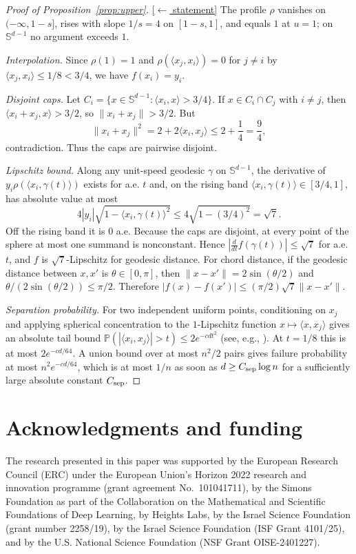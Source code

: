 \documentclass[11pt,reqno]{amsart}
\theoremstyle{plain}
\theoremstyle{definition}
\theoremstyle{remark}
\newcommand{\Sd}{\mathbb{S}^{d-1}}
\newcommand{\PP}{\mathbb{P}}
\newcommand{\inn}[2]{\langle #1,#2\rangle}
\newcommand{\stmtbutton}[1]{\hyperref[#1]{\textnormal{\footnotesize\textsf{[$\leftarrow$ statement]}}}}
\begin{document}
\begin{proof}[Proof of Proposition~\textup{\ref{prop:upper}}]\label{proof:upper}\stmtbutton{prop:upper}
The profile $\rho$ vanishes on $(-\infty,1-s]$, rises with slope $1/s=4$ on $[1-s,1]$, and equals $1$ at $u=1$; on $\Sd$ no argument exceeds $1$.

\emph{Interpolation.} Since $\rho(1)=1$ and $\rho(\inn{x_j}{x_i})=0$ for $j\ne i$ by $\inn{x_j}{x_i}\le1/8<3/4$, we have $f(x_i)=y_i$.

\emph{Disjoint caps.} Let $C_i=\{x\in\Sd:\inn{x_i}{x}>3/4\}$. If $x\in C_i\cap C_j$ with $i\ne j$, then $\inn{x_i+x_j}{x}>3/2$, so $\|x_i+x_j\|>3/2$. But
\[
        \|x_i+x_j\|^2=2+2\inn{x_i}{x_j}\le 2+\frac14=\frac94,
\]
contradiction. Thus the caps are pairwise disjoint.

\emph{Lipschitz bound.} Along any unit-speed geodesic $\gamma$ on $\Sd$, the derivative of $y_i\rho(\inn{x_i}{\gamma(t)})$ exists for a.e. $t$ and, on the rising band $\inn{x_i}{\gamma(t)}\in[3/4,1]$, has absolute value at most
\[
        4|y_i|\sqrt{1-\inn{x_i}{\gamma(t)}^2}\le4\sqrt{1-(3/4)^2}=\sqrt7.
\]
Off the rising band it is $0$ a.e. Because the caps are disjoint, at every point of the sphere at most one summand is nonconstant. Hence $|\frac{d}{dt}f(\gamma(t))|\le\sqrt7$ for a.e. $t$, and $f$ is $\sqrt7$-Lipschitz for geodesic distance. For chord distance, if the geodesic distance between $x,x'$ is $\theta\in[0,\pi]$, then $\|x-x'\|=2\sin(\theta/2)$ and $\theta/(2\sin(\theta/2))\le\pi/2$. Therefore $|f(x)-f(x')|\le(\pi/2)\sqrt7\|x-x'\|$.

\emph{Separation probability.} For two independent uniform points, conditioning on $x_j$ and applying spherical concentration to the $1$-Lipschitz function $x\mapsto\inn{x}{x_j}$ gives an absolute tail bound $\PP(|\inn{x_i}{x_j}|>t)\le2e^{-c d t^2}$ (see, e.g., \cite[Ch.~5]{Vershynin}). At $t=1/8$ this is at most $2e^{-c d/64}$. A union bound over at most $n^2/2$ pairs gives failure probability at most $n^2e^{-c d/64}$, which is at most $1/n$ as soon as $d\ge C_{\rm sep}\log n$ for a sufficiently large absolute constant $C_{\rm sep}$.
\end{proof}

\section*{Acknowledgments and funding}
The research presented in this paper was supported by the European Research Council (ERC) under the European Union's Horizon 2022 research and innovation programme (grant agreement No.~101041711), by the Simons Foundation as part of the Collaboration on the Mathematical and Scientific Foundations of Deep Learning, by Heights Labs, by the Israel Science Foundation (grant number 2258/19), by the Israel Science Foundation (ISF Grant 4101/25), and by the U.S. National Science Foundation (NSF Grant OISE-2401227).
\end{document}
